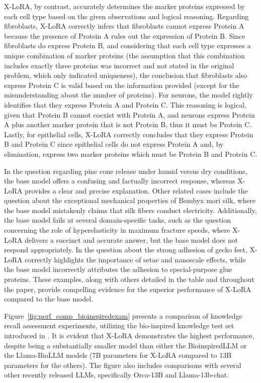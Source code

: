 X-LoRA, by contrast, accurately determines the marker proteins expressed by each cell type based on the given observations and logical reasoning. Regarding fibroblasts, X-LoRA correctly infers that fibroblasts cannot express Protein A because the presence of Protein A rules out the expression of Protein B. Since fibroblasts do express Protein B, and considering that each cell type expresses a unique combination of marker proteins (the assumption that this combination includes exactly three proteins was incorrect and not stated in the original problem, which only indicated uniqueness), the conclusion that fibroblasts also express Protein C is valid based on the information provided (except for the misunderstanding about the number of proteins). For neurons, the model rightly identifies that they express Protein A and Protein C. This reasoning is logical, given that Protein B cannot coexist with Protein A, and neurons express Protein A plus another marker protein that is not Protein B, thus it must be Protein C. Lastly, for epithelial cells, X-LoRA correctly concludes that they express Protein B and Protein C since epithelial cells do not express Protein A and, by elimination, express two marker proteins which must be Protein B and Protein C.

In the question regarding pine cone release under humid versus dry conditions, the base model offers a confusing and factually incorrect response, whereas X-LoRA provides a clear and precise explanation. Other related cases include the question about the exceptional mechanical properties of Bombyx mori silk, where the base model mistakenly claims that silk fibers conduct electricity. Additionally, the base model fails at several domain-specific tasks, such as the question concerning the role of hyperelasticity in maximum fracture speeds, where X-LoRA delivers a succinct and accurate answer, but the base model does not respond appropriately. In the question about the strong adhesion of gecko feet, X-LoRA correctly highlights the importance of setae and nanoscale effects, while the base model incorrectly attributes the adhesion to special-purpose glue proteins. These examples, along with others detailed in the table and throughout the paper, provide compelling evidence for the superior performance of X-LoRA compared to the base model.

Figure~\ref{fig:perf_comp_bioinspiredexam} presents a comparison of knowledge recall assessment experiments, utilizing the bio-inspired knowledge test set introduced in \cite{Luu2023BioinspiredLLM:Materials}. It is evident that X-LoRA demonstrates the highest performance, despite being a substantially smaller model than either the BioinspiredLLM or the Llama-BioLLM models (7B parameters for X-LoRA compared to 13B parameters for the others). The figure also includes comparisons with several other recently released LLMs, specifically Orca-13B and Llama-13b-chat.

